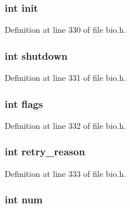 \subsubsection[{\texorpdfstring{init}{init}}]{\setlength{\rightskip}{0pt plus 5cm}int init}\hypertarget{structbio__st_a795ea50921b36311ffd5e7baa2ef1f7e}{}\label{structbio__st_a795ea50921b36311ffd5e7baa2ef1f7e}


Definition at line 330 of file bio.\+h.

\subsubsection[{\texorpdfstring{shutdown}{shutdown}}]{\setlength{\rightskip}{0pt plus 5cm}int shutdown}\hypertarget{structbio__st_a5161d377a61befc3f8103e794d5cb582}{}\label{structbio__st_a5161d377a61befc3f8103e794d5cb582}


Definition at line 331 of file bio.\+h.

\subsubsection[{\texorpdfstring{flags}{flags}}]{\setlength{\rightskip}{0pt plus 5cm}int flags}\hypertarget{structbio__st_ac8bf36fe0577cba66bccda3a6f7e80a4}{}\label{structbio__st_ac8bf36fe0577cba66bccda3a6f7e80a4}


Definition at line 332 of file bio.\+h.

\subsubsection[{\texorpdfstring{retry\+\_\+reason}{retry_reason}}]{\setlength{\rightskip}{0pt plus 5cm}int retry\+\_\+reason}\hypertarget{structbio__st_a0f03de3dae66a786602cf5b4d099706b}{}\label{structbio__st_a0f03de3dae66a786602cf5b4d099706b}


Definition at line 333 of file bio.\+h.

\subsubsection[{\texorpdfstring{num}{num}}]{\setlength{\rightskip}{0pt plus 5cm}int num}\hypertarget{structbio__st_a86cf672daa4e0ad11ad10efc894d19c8}{}\label{structbio__st_a86cf672daa4e0ad11ad10efc894d19c8}


